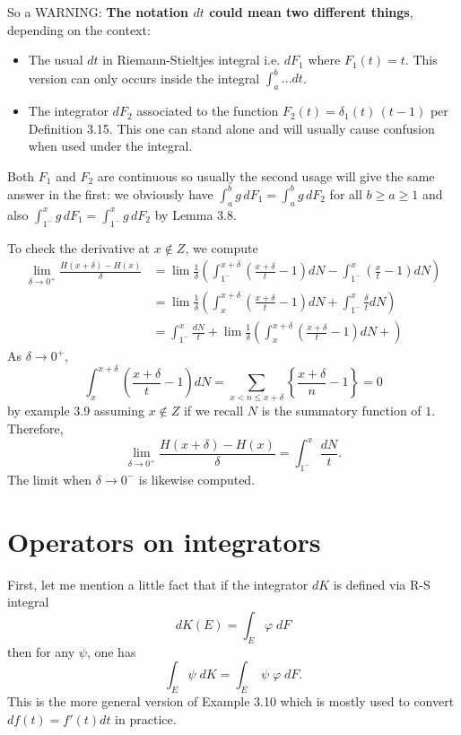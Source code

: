 \documentclass{article}
\begin{document}
So a WARNING: \textbf{The notation $dt$ could mean two different things}, depending on the context:
\begin{itemize}
\item The usual $dt$ in Riemann-Stieltjes integral i.e. $dF_1$ where $F_1(t) = t$. This version can only occurs inside the integral $\int_a^b ... dt$.
\item The integrator $dF_2$ associated to the function $F_2(t) = \delta_1(t) \, (t - 1)$ per Definition 3.15. This one can stand alone and will usually cause confusion when used under the integral.
\end{itemize}
Both $F_1$ and $F_2$ are continuous so usually the second usage will give the same answer in the first: we obviously have $\int_a^b g \, dF_1 = \int_a^b g \, dF_2$ for all $b \geq a \geq 1$ and also $\int_{1^-}^x g \, dF_1 = \int_{1^-}^x g \, dF_2$ by Lemma 3.8.

To check the derivative at $x \not\in Z$, we compute
\begin{align*}
\lim_{\delta \rightarrow 0^+} \frac{H(x + \delta) - H(x)}{\delta} &= \lim \frac 1\delta \left( \int_{1^-}^{x+\delta} (\frac {x+\delta} t - 1) dN - \int_{1^-}^x (\frac xt - 1) dN \right)\\
&= \lim \frac 1\delta \left( \int_{x}^{x+\delta} (\frac {x+\delta} t - 1) dN + \int_{1^-}^x \frac \delta t dN \right)\\
&= \int_{1^-}^x \frac{dN}{t} + \lim \frac 1\delta \left( \int_{x}^{x+\delta} (\frac {x+\delta} t - 1) dN +  \right)
\end{align*}
As $\delta \rightarrow 0^+$,
$$\int_{x}^{x+\delta} (\frac {x+\delta} t - 1) dN = \sum_{x < n \leq x + \delta} \left\{\frac{x + \delta}{n} - 1\right\} = 0$$
by example 3.9 assuming $x \not\in Z$ if we recall $N$ is the summatory function of $1$. Therefore,
$$\lim_{\delta \rightarrow 0^+} \frac{H(x + \delta) - H(x)}{\delta} = \int_{1^-}^x \frac{dN}{t}.$$
The limit when $\delta \rightarrow 0^-$ is likewise computed.

\section{Operators on integrators}

First, let me mention a little fact that if the integrator $dK$ is defined via R-S integral
$$dK(E) = \int_E \varphi \; dF$$
then for any $\psi$, one has
$$\int_E \psi \; dK = \int_E \; \psi \; \varphi \; dF.$$
This is the more general version of Example 3.10 which is mostly used to convert $d f(t) = f'(t) dt$ in practice.
\end{document}
